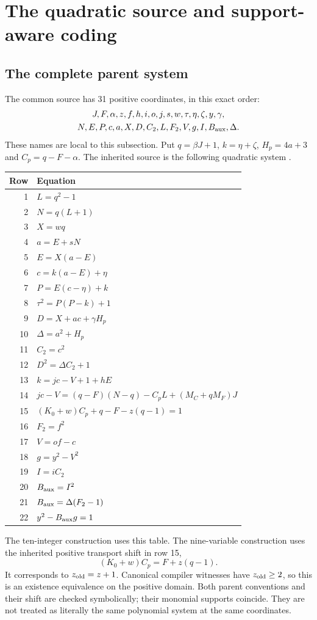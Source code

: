 \section{The quadratic source and support-aware coding}\label{sec:sparse}

\subsection{The complete parent system}
The common source has 31 positive coordinates, in this exact order:
\[
\begin{gathered}
J,F,\alpha,z,f,h,i,o,j,s,w,\tau,\eta,\zeta,y,\gamma,\\
N,E,P,c,a,X,D,C_2,L,F_2,V,g,I,B_{\rm aux},\Delta.
\end{gathered}
\]
These names are local to this subsection. Put
$q=\beta J+1$, $k=\eta+\zeta$, $H_p=4a+3$ and
$C_p=q-F-\alpha$. The inherited source is the following quadratic system
\cite{package31,package40}.
\begin{longtable}{@{}rl@{}}
\toprule Row & Equation\\\midrule\endhead
1 &$L=q^2-1$\\[2pt]
2 &$N=q(L+1)$\\[2pt]
3 &$X=wq$\\[2pt]
4 &$a=E+sN$\\[2pt]
5 &$E=X(a-E)$\\[2pt]
6 &$c=k(a-E)+\eta$\\[2pt]
7 &$P=E(c-\eta)+k$\\[2pt]
8 &$\tau^2=P(P-k)+1$\\[2pt]
9 &$D=X+ac+\gamma H_p$\\[2pt]
10 &$\Delta=a^2+H_p$\\[2pt]
11 &$C_2=c^2$\\[2pt]
12 &$D^2=\Delta C_2+1$\\[2pt]
13 &$k=jc-V+1+hE$\\[2pt]
14 &$jc-V=(q-F)(N-q)-C_pL+(M_C+qM_F)J$\\[2pt]
15 &$(K_0+w)C_p+q-F-z(q-1)=1$\\[2pt]
16 &$F_2=f^2$\\[2pt]
17 &$V=of-c$\\[2pt]
18 &$g=y^2-V^2$\\[2pt]
19 &$I=iC_2$\\[2pt]
20 &$B_{\rm aux}=I^2$\\[2pt]
21 &$B_{\rm aux}=\Delta(F_2-1)$\\[2pt]
22 &$y^2-B_{\rm aux}g=1$\\
\bottomrule
\end{longtable}
The ten-integer construction uses this table. The nine-variable
construction uses the inherited positive transport shift in row 15,
\[
 (K_0+w)C_p=F+z(q-1).
\]
It corresponds to $z_{\rm old}=z+1$. Canonical compiler witnesses have
$z_{\rm old}\ge2$, so this is an existence equivalence on the positive
domain. Both parent conventions and their shift are checked symbolically;
their monomial supports coincide. They are not treated as literally the
same polynomial system at the same coordinates.

